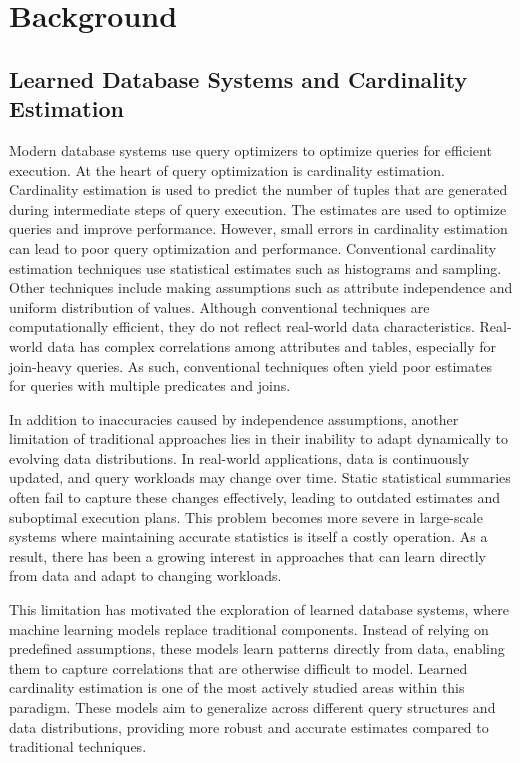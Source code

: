 \chapter{Background}
\label{chap:background}
\pagestyle{plain}

\section{Learned Database Systems and Cardinality Estimation}

Modern database systems use query optimizers to optimize queries for efficient execution. At the heart of query optimization is cardinality estimation. Cardinality estimation is used to predict the number of tuples that are generated during intermediate steps of query execution. The estimates are used to optimize queries and improve performance. However, small errors in cardinality estimation can lead to poor query optimization and performance. Conventional cardinality estimation techniques use statistical estimates such as histograms and sampling. Other techniques include making assumptions such as attribute independence and uniform distribution of values. Although conventional techniques are computationally efficient, they do not reflect real-world data characteristics. Real-world data has complex correlations among attributes and tables, especially for join-heavy queries. As such, conventional techniques often yield poor estimates for queries with multiple predicates and joins.

In addition to inaccuracies caused by independence assumptions, another limitation of traditional approaches lies in their inability to adapt dynamically to evolving data distributions. In real-world applications, data is continuously updated, and query workloads may change over time. Static statistical summaries often fail to capture these changes effectively, leading to outdated estimates and suboptimal execution plans. This problem becomes more severe in large-scale systems where maintaining accurate statistics is itself a costly operation. As a result, there has been a growing interest in approaches that can learn directly from data and adapt to changing workloads.

This limitation has motivated the exploration of learned database systems, where machine learning models replace traditional components. Instead of relying on predefined assumptions, these models learn patterns directly from data, enabling them to capture correlations that are otherwise difficult to model. Learned cardinality estimation is one of the most actively studied areas within this paradigm. These models aim to generalize across different query structures and data distributions, providing more robust and accurate estimates compared to traditional techniques.

